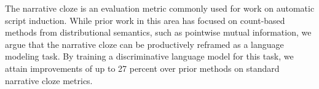 The narrative cloze is an evaluation metric commonly used for work on automatic script induction. While prior work in this area has focused on count-based methods from distributional semantics, such as pointwise mutual information, we argue that the narrative cloze can be productively reframed as a language modeling task. By training a discriminative language model for this task, we attain improvements of up to 27 percent over prior methods on standard narrative cloze metrics.
